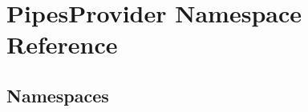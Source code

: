 \hypertarget{namespace_pipes_provider}{}\section{Pipes\+Provider Namespace Reference}
\label{namespace_pipes_provider}
\subsection*{Namespaces}
\begin{DoxyCompactItemize}
\end{DoxyCompactItemize}
